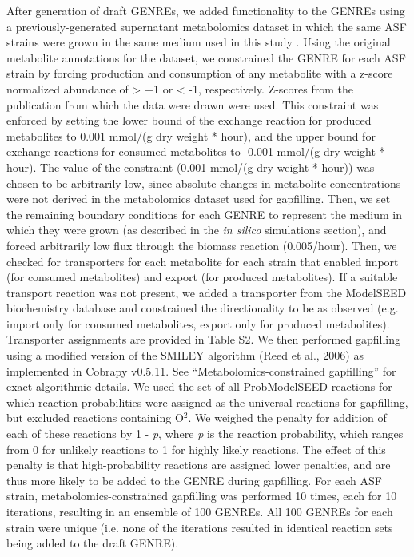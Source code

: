 \documentclass[11pt,twocolumn,notitlepage,openany,twoside]{book}
\begin{document}
\begin{refsection}
After generation of draft GENREs, we added functionality to the GENREs using a previously-generated supernatant metabolomics dataset in which the same ASF strains were grown in the same medium used in this study \cite{Biggs2017-fs}. Using the original metabolite annotations for the dataset, we constrained the GENRE for each ASF strain by forcing production and consumption of any metabolite with a z-score normalized abundance of > +1 or < -1, respectively. Z-scores from the publication from which the data were drawn were used. This constraint was enforced by setting the lower bound of the exchange reaction for produced metabolites to 0.001 mmol/(g dry weight * hour), and the upper bound for exchange reactions for consumed metabolites to -0.001 mmol/(g dry weight * hour). The value of the constraint (0.001 mmol/(g dry weight * hour)) was chosen to be arbitrarily low, since absolute changes in metabolite concentrations were not derived in the metabolomics dataset used for gapfilling. Then, we set the remaining boundary conditions for each GENRE to represent the medium in which they were grown (as described in the \textit{in silico} simulations section), and forced arbitrarily low flux through the biomass reaction (0.005/hour). Then, we checked for transporters for each metabolite for each strain that enabled import (for consumed metabolites) and export (for produced metabolites). If a suitable transport reaction was not present, we added a transporter from the ModelSEED biochemistry database and constrained the directionality to be as observed (e.g. import only for consumed metabolites, export only for produced metabolites). Transporter assignments are provided in Table S2. We then performed gapfilling using a modified version of the SMILEY algorithm \cite{Reed2006-qv}(Reed et al., 2006) as implemented in Cobrapy v0.5.11. See “Metabolomics-constrained gapfilling” for exact algorithmic details. We used the set of all ProbModelSEED reactions for which reaction probabilities were assigned as the universal reactions for gapfilling, but excluded reactions containing O$^2$. We weighed the penalty for addition of each of these reactions by 1 - \textit{p}, where \textit{p} is the reaction probability, which ranges from 0 for unlikely reactions to 1 for highly likely reactions. The effect of this penalty is that high-probability reactions are assigned lower penalties, and are thus more likely to be added to the GENRE during gapfilling. For each ASF strain, metabolomics-constrained gapfilling was performed 10 times, each for 10 iterations, resulting in an ensemble of 100 GENREs. All 100 GENREs for each strain were unique (i.e. none of the iterations resulted in identical reaction sets being added to the draft GENRE).


\end{refsection}
\end{document}
